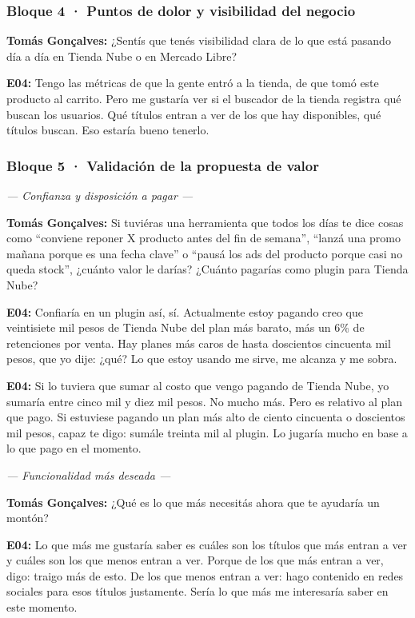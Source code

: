 \subsubsection*{Bloque 4 · Puntos de dolor y visibilidad del negocio}

\noindent\textbf{Tomás Gonçalves:} ¿Sentís que tenés visibilidad clara de lo que está pasando día a día en Tienda Nube o en Mercado Libre?

\noindent\textbf{E04:} Tengo las métricas de que la gente entró a la tienda, de que tomó este producto al carrito. Pero me gustaría ver si el buscador de la tienda registra qué buscan los usuarios. Qué títulos entran a ver de los que hay disponibles, qué títulos buscan. Eso estaría bueno tenerlo.

\subsubsection*{Bloque 5 · Validación de la propuesta de valor}

\noindent\textit{--- Confianza y disposición a pagar ---}

\noindent\textbf{Tomás Gonçalves:} Si tuviéras una herramienta que todos los días te dice cosas como ``conviene reponer X producto antes del fin de semana'', ``lanzá una promo mañana porque es una fecha clave'' o ``pausá los ads del producto porque casi no queda stock'', ¿cuánto valor le darías? ¿Cuánto pagarías como plugin para Tienda Nube?

\noindent\textbf{E04:} Confiaría en un plugin así, sí. Actualmente estoy pagando creo que veintisiete mil pesos de Tienda Nube del plan más barato, más un 6\% de retenciones por venta. Hay planes más caros de hasta doscientos cincuenta mil pesos, que yo dije: ¿qué? Lo que estoy usando me sirve, me alcanza y me sobra.

\noindent\textbf{E04:} Si lo tuviera que sumar al costo que vengo pagando de Tienda Nube, yo sumaría entre cinco mil y diez mil pesos. No mucho más. Pero es relativo al plan que pago. Si estuviese pagando un plan más alto de ciento cincuenta o doscientos mil pesos, capaz te digo: sumále treinta mil al plugin. Lo jugaría mucho en base a lo que pago en el momento.

\noindent\textit{--- Funcionalidad más deseada ---}

\noindent\textbf{Tomás Gonçalves:} ¿Qué es lo que más necesitás ahora que te ayudaría un montón?

\noindent\textbf{E04:} Lo que más me gustaría saber es cuáles son los títulos que más entran a ver y cuáles son los que menos entran a ver. Porque de los que más entran a ver, digo: traigo más de esto. De los que menos entran a ver: hago contenido en redes sociales para esos títulos justamente. Sería lo que más me interesaría saber en este momento.

